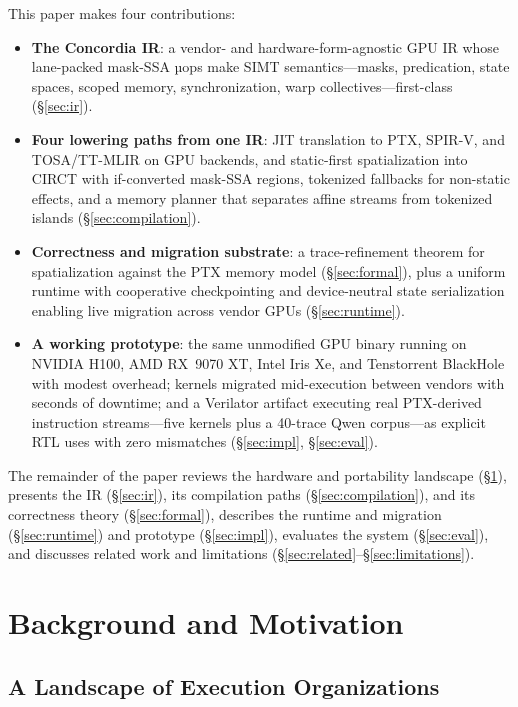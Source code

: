 \documentclass[sigplan,nonacm]{acmart}
\newcommand{\circt}{CIRCT\xspace}
\begin{document}
This paper makes four contributions:
\begin{itemize}
  \item \textbf{The Concordia IR}: a vendor- and hardware-form-agnostic GPU
  IR whose lane-packed mask-SSA µops make SIMT semantics---masks,
  predication, state spaces, scoped memory, synchronization, warp
  collectives---first-class (\S\ref{sec:ir}).
  \item \textbf{Four lowering paths from one IR}: JIT translation to PTX,
  SPIR-V, and TOSA/TT-MLIR on GPU backends, and static-first spatialization
  into \circt with if-converted mask-SSA regions, tokenized fallbacks for
  non-static effects, and a memory planner that separates affine streams
  from tokenized islands (\S\ref{sec:compilation}).
  \item \textbf{Correctness and migration substrate}: a trace-refinement
  theorem for spatialization against the PTX memory model
  (\S\ref{sec:formal}), plus a uniform runtime with cooperative
  checkpointing and device-neutral state serialization enabling live
  migration across vendor GPUs (\S\ref{sec:runtime}).
  \item \textbf{A working prototype}: the same unmodified GPU binary running
  on NVIDIA H100, AMD RX~9070 XT, Intel Iris Xe, and Tenstorrent BlackHole
  with modest overhead; kernels migrated mid-execution between vendors with
  seconds of downtime; and a Verilator artifact executing real PTX-derived
  instruction streams---five kernels plus a 40-trace Qwen corpus---as
  explicit RTL uses with zero mismatches (\S\ref{sec:impl},
  \S\ref{sec:eval}).
\end{itemize}

The remainder of the paper reviews the hardware and portability landscape
(\S\ref{sec:background}), presents the IR (\S\ref{sec:ir}), its compilation
paths (\S\ref{sec:compilation}), and its correctness theory
(\S\ref{sec:formal}), describes the runtime and migration
(\S\ref{sec:runtime}) and prototype (\S\ref{sec:impl}), evaluates the system
(\S\ref{sec:eval}), and discusses related work and limitations
(\S\ref{sec:related}--\S\ref{sec:limitations}).

\section{Background and Motivation}
\label{sec:background}

\subsection{A Landscape of Execution Organizations}
\label{sec:vendors}
\end{document}
